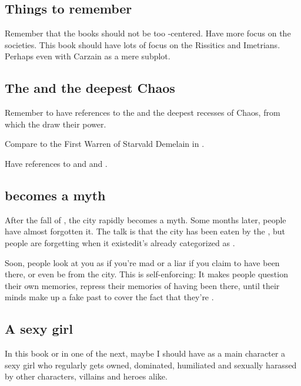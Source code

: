 \subsection{Things to remember}
Remember that the books should not be too \human-centered. 
Have more focus on the \scathaese{} societies. 
This book should have lots of focus on the Rissitics and Imetrians. 
Perhaps even with Carzain as a mere subplot. 









\subsection{The \xzaishanns{} and the deepest Chaos}
Remember to have references to the \xzaishanns{} and the deepest recesses of Chaos, from which the \dragons{} draw their power. 

Compare to the First Warren of Starvald Demelain in \cite{StevenEriksonIanCameronEsslemont:MalazanBookoftheFallen}.

Have references to  and  and . 









\subsection{\Malcur becomes a myth}
After the fall of \Malcur, the city rapidly becomes a myth. Some months later, people have almost forgotten it. 
The talk is that the city has been eaten by the \Wylde{}, but people are forgetting when it existed\dash it's already categorized as . 

Soon, people look at you as if you're mad or a liar if you claim to have been there, or even be from the city. 
This is self-enforcing: 
It makes people question their own memories, repress their memories of having been there, until their minds make up a fake past to cover the fact that they're \Malcurian. 









\subsection{A sexy girl}
In this book or in one of the next, maybe I should have as a main character a sexy girl who regularly gets owned, dominated, humiliated and sexually harassed by other characters, villains and heroes alike. 





